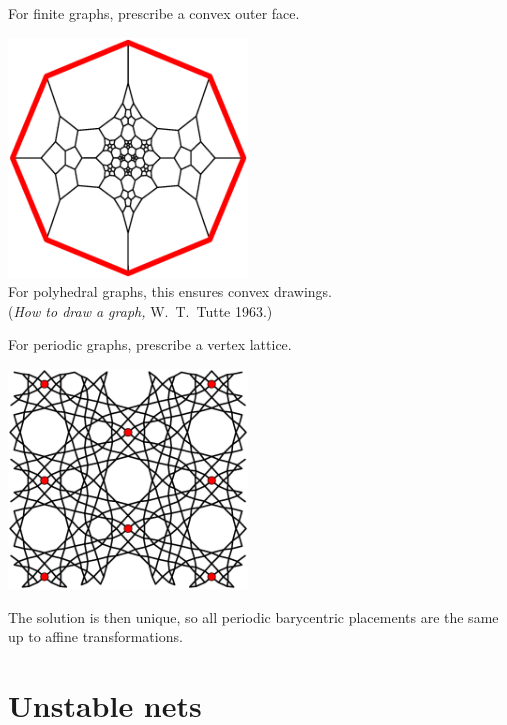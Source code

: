 \documentclass{beamer}
\begin{document}
\begin{frame}
  \begin{center}
    For finite graphs, prescribe a convex outer face.

    \includegraphics[width=2.5in]{schlegel2}\\
    For polyhedral graphs, this ensures convex drawings.\\
    ({\em How to draw a graph,} W.\ T.\ Tutte 1963.)
  \end{center}
\end{frame}

\begin{frame}
  \begin{center}
    For periodic graphs, prescribe a vertex lattice.

    \includegraphics[width=2.5in]{al-equilibrium}

    The solution is then unique, so all periodic barycentric placements are
    the same up to affine transformations.
  \end{center}
\end{frame}


\section{Unstable nets}
\end{document}

